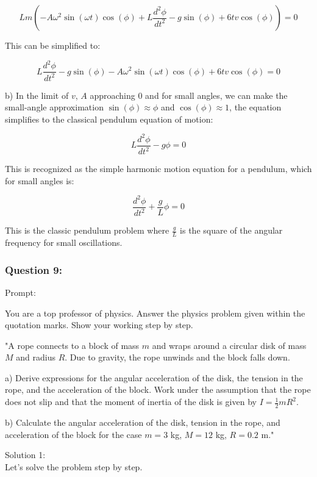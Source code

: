 \documentclass[a4paper,11pt]{article}
\begin{document}
\[ Lm \left( -A\omega^2 \sin(\omega t) \cos(\phi) + L \frac{d^2 \phi}{dt^2} - g \sin(\phi) + 6tv \cos(\phi) \right) = 0 \]

This can be simplified to:

\[ L \frac{d^2 \phi}{dt^2} - g \sin(\phi) - A\omega^2 \sin(\omega t) \cos(\phi) + 6tv \cos(\phi) = 0 \]

b) In the limit of \( v \), \( A \) approaching 0 and for small angles, we can make the small-angle approximation \( \sin(\phi) \approx \phi \) and \( \cos(\phi) \approx 1 \), the equation simplifies to the classical pendulum equation of motion:

\[ L\frac{d^2 \phi}{dt^2} - g \phi = 0 \]

This is recognized as the simple harmonic motion equation for a pendulum, which for small angles is:

\[ \frac{d^2 \phi}{dt^2} + \frac{g}{L} \phi = 0 \]

This is the classic pendulum problem where \( \frac{g}{L} \) is the square of the angular frequency for small oscillations.

\subsubsection*{Question 9:}

Prompt:
\begin{spverbatim}
    You are a top professor of physics. Answer the physics problem given within the quotation marks. Show your working step by step.

    "A rope connects to a block of mass \( m \) and wraps around a circular disk of mass \( M \) and radius \( R \). Due to gravity, the rope unwinds and the block falls down. 

    a) Derive expressions for the angular acceleration of the disk, the tension in the rope, and the acceleration of the block. Work under the assumption that the rope does not slip and that the moment of inertia of the disk is given by \( I = \frac{1}{2} m R^{2} \).
    
    b) Calculate the angular acceleration of the disk, tension in the rope, and acceleration of the block for the case \( m = 3 \) kg, \( M = 12 \) kg, \( R = 0.2 \) m."
\end{spverbatim}

\bigskip

\noindent Solution 1: \\

Let's solve the problem step by step.
\end{document}
